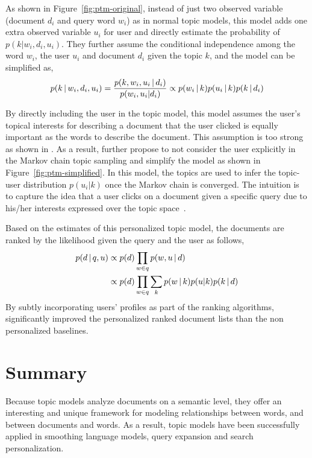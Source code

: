 As shown in Figure~\ref{fig:ptm-original}, instead of just two observed variable (document $d_i$ and query word $w_i$) as in normal topic models, this model adds one extra observed variable $u_i$ for user and directly estimate the probability of $p(k|w_i, d_i, u_i)$. They further assume the conditional independence among the word $w_i$, the user $u_i$ and document $d_i$ given the topic $k$, and the model can be simplified as,
\begin{align}
p(k \, | \, w_i, d_i, u_i) = \frac{p(k,w_i, u_i  \, | \,  d_i)}{p(w_i, u_i | d_i)} \propto p(w_i \, | \, k) p(u_i \, | \, k) p (k \, | \, d_i)
\end{align}

By directly including the user in the topic model, this model assumes the user's topical interests for describing a document that the user clicked is equally important as the words to describe the document. This assumption is too strong as shown in \citet{Carman-2010}. As a result, \citet{Harvey-2013} further propose to not consider the user explicitly in the Markov chain topic sampling and simplify the model as shown in Figure~\ref{fig:ptm-simplified}. In this model, the topics are used to infer the topic-user distribution $p(u_i|k)$ once the Markov chain is converged. The intuition is to capture the idea that a user clicks on a document given a specific query due to his/her interests expressed over the topic space~\citep{Harvey-2013}.

Based on the estimates of this personalized topic model, the documents are ranked by the likelihood given the query and the user as follows,
\begin{align}
p(d  \, | \,  q,u) &\propto p(d) \prod_{w \in q} p(w, u  \, | \,  d)\\
&\propto p(d) \prod_{w \in q} \sum_k p(w \, | \, k) p(u|k) p(k \, | \, d) \notag
\end{align}
By subtly incorporating users' profiles as part of the ranking algorithms, \citet{Harvey-2013} significantly improved the personalized ranked document lists than the non personalized baselines.

\section{Summary}

Because topic models analyze documents on a semantic level, they offer
an interesting and unique framework for modeling relationships between words, and between documents and words.
As a result, topic models have been
successfully applied in smoothing language models, query expansion and search personalization.

